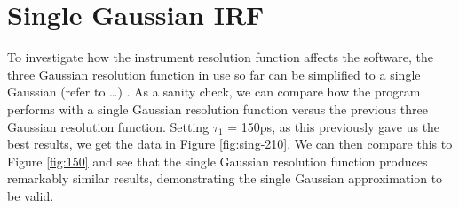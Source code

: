 \pagebreak

\section{Single Gaussian IRF}

To investigate how the instrument resolution function affects the software, the three Gaussian resolution function in use so far can be simplified to a single Gaussian (refer to \dots) . As a sanity check, we can compare how the program 
performs with a single Gaussian resolution function versus the previous three Gaussian resolution function. Setting $\tau_1$ = 150ps, as this previously gave us the best results, we get the data in Figure \ref{fig:sing-210}. We can then compare this to Figure \ref{fig:150} and see that the single Gaussian resolution function produces remarkably similar results, demonstrating the single Gaussian approximation to be valid.

